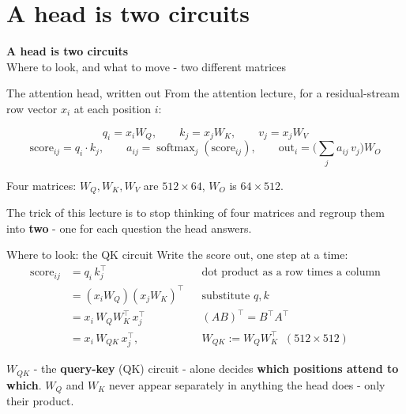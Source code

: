 \documentclass[aspectratio=169]{beamer}
\newcommand{\keybox}[1]{%
  \begin{tcolorbox}[colback=armblue!8, colframe=armblue, boxrule=0.6pt, arc=2pt]
  #1
  \end{tcolorbox}}
\newcommand{\sectiontransition}[2]{%
  \begin{frame}[plain]
    \vfill
    \begin{center}
      {\Huge\bfseries\color{popblue} #1}\\[1.1em]
      {\large #2}
    \end{center}
    \vfill
  \end{frame}}
\begin{document}
\section{A head is two circuits}
\sectiontransition{A head is two circuits}{Where to look, and what to move - two different matrices}

\begin{frame}{The attention head, written out}
  \vspace{0.3em}
  From the attention lecture, for a residual-stream row vector $x_i$ at each position $i$:

  \vspace{0.3em}
  \[
    q_i = x_i W_Q, \qquad k_j = x_j W_K, \qquad v_j = x_j W_V
  \]
  \[
    \text{score}_{ij} = q_i \cdot k_j, \qquad a_{ij} = \operatorname{softmax}_j(\text{score}_{ij}),
    \qquad \text{out}_i = \Big(\sum_j a_{ij}\, v_j\Big) W_O
  \]

  \vspace{0.4em}
  Four matrices: $W_Q, W_K, W_V$ are $512 \times 64$, $W_O$ is $64 \times 512$.

  \vspace{0.6em}
  \keybox{\small The trick of this lecture is to stop thinking of four matrices and regroup them
  into \textbf{two} - one for each question the head answers.}
\end{frame}

\begin{frame}{Where to look: the QK circuit}
  \vspace{0.3em}
  Write the score out, one step at a time:
  \begin{align*}
    \text{score}_{ij}
      &= q_i\, k_j^{\top} && \text{dot product as a row times a column}\\
      &= (x_i W_Q)(x_j W_K)^{\top} && \text{substitute } q, k\\
      &= x_i\, W_Q W_K^{\top}\, x_j^{\top} && (AB)^{\top} = B^{\top}A^{\top}\\
      &= x_i\, W_{QK}\, x_j^{\top}, && W_{QK} := W_Q W_K^{\top} \;\;(512 \times 512)
  \end{align*}

  \vspace{0.2em}
  \keybox{\small $W_{QK}$ - the \textbf{query-key} (QK) circuit - alone decides \textbf{which positions
  attend to which}. $W_Q$ and $W_K$
  never appear separately in anything the head does - only their product.}
\end{frame}
\end{document}
